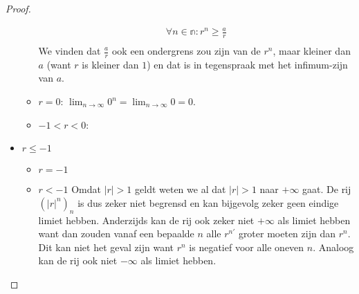 \documentclass[main.tex]{subfiles}
\begin{document}
\begin{pr}
\begin{proof}
\begin{itemize}
\begin{itemize}
\[\begin{array}{c}
          \forall n\in \mathbb{n}: r^{n} \ge \frac{a}{r}\\
        \end{array}
        \]
        We vinden dat $\frac{a}{r}$ ook een ondergrens zou zijn van de $r^{n}$, maar kleiner dan $a$ (want $r$ is kleiner dan $1$) en dat is in tegenspraak met het infimum-zijn van $a$.
      \item $r=0$: $\lim_{n \rightarrow \infty}0^{n}=\lim_{n \rightarrow \infty}0=0$.
      \item $-1<r<0$:
      \end{itemize}
    \item $r \le -1$
      \begin{itemize}
      \item $r=-1$
      \item $r<-1$
        Omdat $|r|>1$ geldt weten we al dat $|r|>1$ naar $+\infty$ gaat.
        De rij $(|r|^{n})_{n}$ is dus zeker niet begrensd \needed en kan bijgevolg zeker geen eindige limiet hebben. 
        Anderzijds kan de rij ook zeker niet $+\infty$ als limiet hebben want dan zouden vanaf een bepaalde $n$ alle $r^{n'}$ groter moeten zijn dan $r^{n}$.
        Dit kan niet het geval zijn want $r^{n}$ is negatief voor alle oneven $n$.
        Analoog kan de rij ook niet $-\infty$ als limiet hebben.
      \end{itemize}
    \end{itemize}
  \end{proof}
\end{pr}
\end{document}
